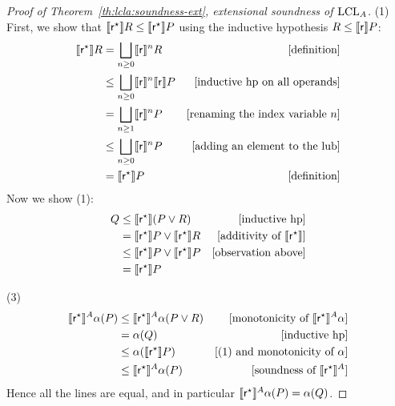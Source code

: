 \begin{proof}[Proof of Theorem~\ref{th:lcla:soundness-ext}, extensional soundness of $\text{LCL}_A$]
	\noindent (1) First, we show that $\llbracket\mathsf{r}^{\star}\rrbracket R \le \llbracket\mathsf{r}^{\star}\rrbracket P$ using the inductive hypothesis $R \le \llbracket\mathsf{r}\rrbracket P$:
	\begin{align*}
		\llbracket\mathsf{r}^{\star}\rrbracket R & = \bigsqcup_{n \ge 0} \llbracket\mathsf{r}\rrbracket^n R                 & [\text{definition}]                    \\
		                         & \le \bigsqcup_{n \ge 0} \llbracket\mathsf{r}\rrbracket^n \llbracket\mathsf{r}\rrbracket P & [\text{inductive hp on all operands}]  \\
		                         & = \bigsqcup_{n \ge 1} \llbracket\mathsf{r}\rrbracket^n P                 & [\text{renaming the index variable }n] \\
		                         & \le \bigsqcup_{n \ge 0} \llbracket\mathsf{r}\rrbracket^n P               & [\text{adding an element to the lub}]  \\
		                         & = \llbracket\mathsf{r}^{\star}\rrbracket P                              & [\text{definition}]
	\end{align*}
	Now we show (1):
	\begin{align*}
		Q & \le \llbracket\mathsf{r}^{\star}\rrbracket (P \lor R)                      & [\text{inductive hp}]                         \\
		  & = \llbracket\mathsf{r}^{\star}\rrbracket P \lor \llbracket\mathsf{r}^{\star}\rrbracket R   & [\text{additivity of }\llbracket\mathsf{r}^{\star}\rrbracket] \\
		  & \le \llbracket\mathsf{r}^{\star}\rrbracket P \lor \llbracket\mathsf{r}^{\star}\rrbracket P & [\text{observation above}]                    \\
		  & = \llbracket\mathsf{r}^{\star}\rrbracket P
	\end{align*}

	\noindent (3)
	\begin{align*}
		\llbracket\mathsf{r}^{\star}\rrbracket^{A} \alpha(P) & \le \llbracket\mathsf{r}^{\star}\rrbracket^{A} \alpha(P \lor R) & [\text{monotonicity of }\llbracket\mathsf{r}^{\star}\rrbracket^{A} \alpha] \\
		                                     & = \alpha(Q)                                     & [\text{inductive hp}]                                      \\
		                                     & \le \alpha(\llbracket\mathsf{r}^{\star}\rrbracket P)            & [\text{(1) and monotonicity of }\alpha]                    \\
		                                     & \le \llbracket\mathsf{r}^{\star}\rrbracket^{A} \alpha(P)        & [\text{soundness of }\llbracket\mathsf{r}^{\star}\rrbracket^{A}]
	\end{align*}
	Hence all the lines are equal, and in particular $\llbracket\mathsf{r}^{\star}\rrbracket^{A} \alpha(P) = \alpha(Q)$.


\end{proof}
